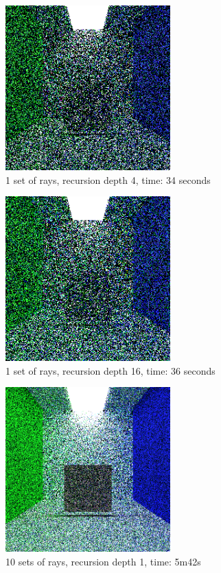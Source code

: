 \documentclass[12pt,journal]{IEEEtran}
\begin{document}
\begin{figure}[!t]

\centering
\includegraphics[width=2.5in]{1s_4d_34s}
\caption{1 set of rays, recursion depth 4, time: 34 seconds}
\label{1s_4d_34s}

\end{figure}

\begin{figure}[!t]

\centering
\includegraphics[width=2.5in]{1s_16d_36s}
\caption{1 set of rays, recursion depth 16, time: 36 seconds}
\label{1s_16d_36s}

\end{figure}

\begin{figure}[!t]

\centering
\includegraphics[width=2.5in]{10s_1d_5m42s}
\caption{10 sets of rays, recursion depth 1, time: 5m42s}
\label{10s_1d_5m42s}

\end{figure}
\end{document}
